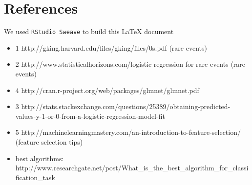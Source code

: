\documentclass[a4paper]{article}
\begin{document}
\section*{References}
We used \texttt{RStudio Sweave} to build this \LaTeX{} document
\begin{itemize}
  \item 1 http://gking.harvard.edu/files/gking/files/0s.pdf (rare events)
  \item 2 http://www.statisticalhorizons.com/logistic-regression-for-rare-events (rare events)
  \item 4 http://cran.r-project.org/web/packages/glmnet/glmnet.pdf
  \item 3 http://stats.stackexchange.com/questions/25389/obtaining-predicted-values-y-1-or-0-from-a-logistic-regression-model-fit
  \item 5 http://machinelearningmastery.com/an-introduction-to-feature-selection/ (feature selection tips)
  \item best algorithms: http://www.researchgate.net/post/What\_is\_the\_best\_algorithm\_for\_classification\_task
\end{itemize}
\end{document}
